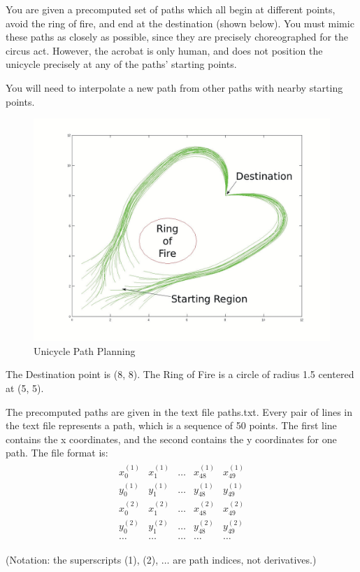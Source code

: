 \documentclass[conference,onecolumn]{IEEEtran}
\begin{document}
\begin{enumerate}[label=\arabic{enumi}.]
          You are given a precomputed set of paths which all begin at different points, avoid the ring of ﬁre, and end at the destination (shown below).
          You must mimic these paths as closely as possible, since they are precisely choreographed for the circus act.
          However, the acrobat is only human, and does not position the unicycle precisely at any of the paths' starting points.

          You will need to interpolate a new path from other paths with nearby starting points.

          \begin{figure}[H]
              \centering
              \includegraphics[width=.8\linewidth]{figs/Q8.jpg}
              \caption{Unicycle Path Planning}
          \end{figure}

          The Destination point is (8, 8). The Ring of Fire is a circle of radius 1.5 centered at (5, 5).

          The precomputed paths are given in the text file paths.txt.
          Every pair of lines in the text file represents a path, which is a sequence of 50 points.
          The first line contains the x coordinates, and the second contains the y coordinates for one path.
          The file format is:
          \begin{align*}
              \begin{matrix}
                  x_0^{(1)} & x_1^{(1)} & \ldots & x_{48}^{(1)} & x_{49}^{(1)} \\
                  y_0^{(1)} & y_1^{(1)} & \ldots & y_{48}^{(1)} & y_{49}^{(1)} \\
                  x_0^{(2)} & x_1^{(2)} & \ldots & x_{48}^{(2)} & x_{49}^{(2)} \\
                  y_0^{(2)} & y_1^{(2)} & \ldots & y_{48}^{(2)} & y_{49}^{(2)} \\
                  \ldots    & \ldots    & \ldots & \ldots       & \ldots
              \end{matrix}
          \end{align*}
          \begin{center}
              (Notation: the superscripts (1), (2), $\ldots$ are path indices, not derivatives.)
          \end{center}


\end{enumerate}
\end{document}
